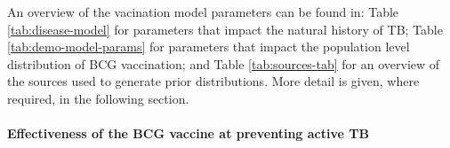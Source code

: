 \documentclass[11pt,twoside]{bristolthesis}
\begin{document}
  An overview of the vacination model parameters can be found in: Table \ref{tab:disease-model} for parameters that impact the natural history of TB; Table \ref{tab:demo-model-params} for parameters that impact the population level distribution of BCG vaccination; and Table \ref{tab:sources-tab} for an overview of the sources used to generate prior distributions. More detail is given, where required, in the following section.
  
  \hypertarget{effectiveness-of-the-bcg-vaccine-at-preventing-active-tb}{%
  \paragraph{Effectiveness of the BCG vaccine at preventing active TB}\label{effectiveness-of-the-bcg-vaccine-at-preventing-active-tb}}
  
\end{document}

